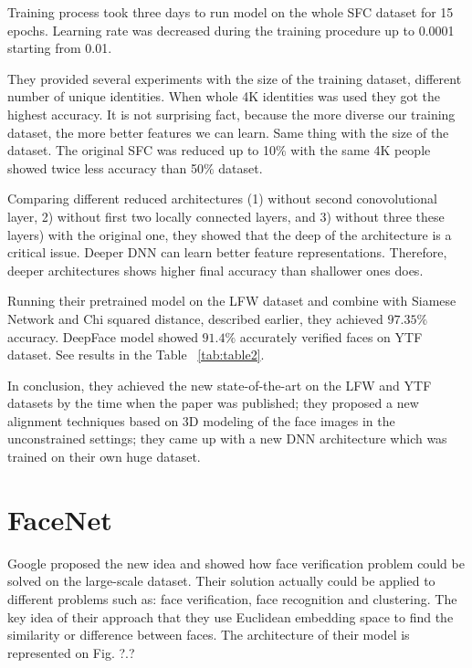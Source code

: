 \documentclass[paper=a4, fontsize=11pt]{scrartcl} %
\numberwithin{equation}{section} %
\numberwithin{figure}{section} %
\numberwithin{table}{section} %
\begin{document}
Training process took three days to run model on the whole SFC dataset for 15 epochs. Learning rate was decreased during the training procedure up to 0.0001 starting from 0.01. \par

They provided several experiments with the size of the training dataset, different number of unique identities. When whole 4K identities was used they got the highest accuracy. It is not surprising fact, because the more diverse our training dataset, the more better features we can learn. Same thing with the size of the dataset. The original SFC was reduced up to 10$\%$ with the same 4K people showed twice less accuracy than 50$\%$ dataset.\par

Comparing different reduced architectures (1) without second conovolutional layer, 2) without first two locally connected layers, and 3) without three these layers) with the original one, they showed that the deep of the architecture is a critical issue. Deeper DNN can learn better feature representations. Therefore, deeper architectures shows higher final accuracy than shallower ones does. \par

Running their pretrained model on the LFW dataset and combine with Siamese Network and Chi squared distance, described earlier, they achieved $97.35\%$ accuracy. DeepFace model showed $91.4\%$ accurately verified faces on YTF dataset. See results in the Table ~\ref{tab:table2}.

In conclusion, they achieved the new state-of-the-art on the LFW and YTF datasets by the time when the paper was published; they proposed a new alignment techniques based on 3D modeling of the face images in the unconstrained settings; they came up with a new DNN architecture which was trained on their own huge dataset.

\section{FaceNet}

Google proposed the new idea \cite{schroff2015facenet} and showed how face verification problem could be solved on the large-scale dataset. Their solution actually could be applied to different problems such as: face verification, face recognition and clustering. The key idea of their approach that they use Euclidean embedding space to find the similarity or difference between faces. The architecture of their model is represented on Fig. ?.?
\end{document}
